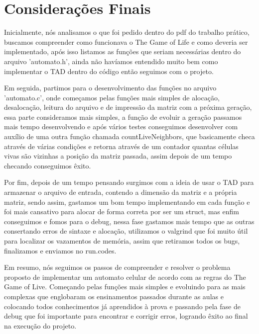 \documentclass{article}
\begin{document}
\clearpage


\section{Considerações Finais}
\DESCRICAO{}

Inicialmente, nós analisamos o que foi pedido dentro do pdf do trabalho prático, buscamos compreender como funcionava o The Game of Life e como deveria ser implementado, após isso listamos as funções que seriam necessárias dentro do arquivo 'automato.h', ainda não havíamos entendido muito bem como implementar o TAD dentro do código então seguimos com o projeto. 

Em seguida, partimos para o desenvolvimento das funções no arquivo 'automato.c', onde começamos pelas funções mais simples de alocação, desalocação, leitura do arquivo e de impressão da matriz com a próxima geração, essa parte consideramos mais simples, a função de evoluir a geração passamos mais tempo desenvolvendo e após vários testes conseguimos  desenvolver com auxílio de uma outra função chamada countLiveNeighbors, que basicamente checa através de várias condições e retorna através de um contador quantas células vivas são vizinhas a posição da matriz passada, assim depois de um tempo checando conseguimos êxito.

Por fim, depois de um tempo pensando surgimos com a ideia de usar o TAD para armazenar o arquivo de entrada, contendo a dimensão da matriz e a própria matriz, sendo assim, gastamos um bom tempo implementando em cada função e foi mais cansativo para alocar de forma correta por ser um struct, mas enfim conseguimos e fomos para o debug, nessa fase gastamos mais tempo que as outras consertando erros de sintaxe e alocação, utilizamos o valgrind que foi muito útil para localizar os vazamentos de memória, assim que retiramos todos os bugs, finalizamos e enviamos no run.codes.

Em resumo, nós seguimos os passos de compreender e resolver o problema proposto de implementar um automato celular de acordo com as regras do The Game of Live. Começando pelas funções mais simples e evoluindo para as mais complexas que englobaram os ensinamentos  passados durante as aulas e colocando todos conhecimentos já aprendidos à prova e passando pela fase de debug que foi importante para encontrar e corrigir erros, logrando êxito ao final na execução do projeto.


\clearpage
\end{document}
